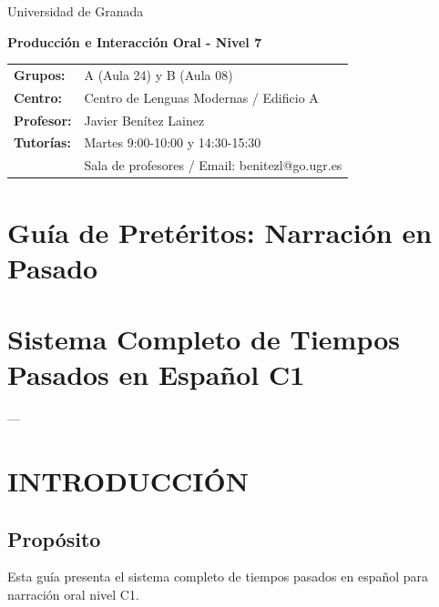 \documentclass[a4paper,11pt]{article}
\begin{document}
\begin{center}
\small{Universidad de Granada}

\vspace{0.3cm}

\textbf{\large{Producción e Interacción Oral - Nivel 7}}

\vspace{0.4cm}

\small
\begin{tabular}{@{}ll@{}}
\textbf{Grupos:} & A (Aula 24) y B (Aula 08) \\
\textbf{Centro:} & Centro de Lenguas Modernas / Edificio A \\
\textbf{Profesor:} & Javier Benítez Lainez \\
\textbf{Tutorías:} & Martes 9:00-10:00 y 14:30-15:30 \\
& Sala de profesores / Email: benitezl@go.ugr.es
\end{tabular}
\end{center}

\vspace{0.5cm}
\section*{Guía de Pretéritos: Narración en Pasado}

\vspace{0.4cm}

\section{Sistema Completo de Tiempos Pasados en Español C1}

\vspace{0.2cm}

---

\vspace{0.2cm}

\section{INTRODUCCIÓN}

\vspace{0.2cm}

\subsection{Propósito}

Esta guía presenta el sistema completo de tiempos pasados en español para narración oral nivel C1.
\end{document}
